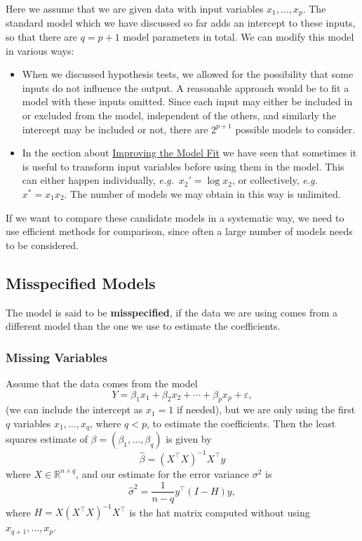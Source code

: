 \documentclass[
  a4paper,
]{article}
\theoremstyle{definition}
\theoremstyle{definition}
\theoremstyle{definition}
\theoremstyle{definition}
\theoremstyle{remark}
\begin{document}
Here we assume that we are given data with input variables \(x_1, \ldots, x_p\).
The standard model which we have discussed so far adds an intercept to these
inputs, so that there are \(q = p+1\) model parameters in total. We can modify
this model in various ways:

\begin{itemize}
\item
  When we discussed hypothesis tests, we allowed for the possibility that
  some inputs do not influence the output. A reasonable approach would
  be to fit a model with these inputs omitted. Since each input
  may either be included in or excluded from the model, independent of
  the others, and similarly the intercept may be included or not,
  there are \(2^{p+1}\) possible models to consider.
\item
  In the section about \hyperref[S11-improving]{Improving the Model Fit} we have seen that
  sometimes it is useful to transform input variables before using them
  in the model. This can either happen individually, \emph{e.g.}~\(x_2' = \log
  x_2\), or collectively, \emph{e.g.}~\(x^\ast = x_1 x_2\). The number of
  models we may obtain in this way is unlimited.
\end{itemize}

If we want to compare these candidate models in a systematic way,
we need to use efficient methods for comparison, since often a large
number of models needs to be considered.

\subsection{Misspecified Models}\label{misspecified-models}

The model is said to be \textbf{misspecified}, if the data we are using
comes from a different model than the one we use to estimate
the coefficients.

\subsubsection{Missing Variables}\label{missing-variables}

Assume that the data comes from the model
\begin{equation*}
  Y = \beta_1 x_1 + \beta_2 x_2 + \cdots + \beta_p x_p + \varepsilon,
\end{equation*}
(we can include the intercept as \(x_1 = 1\) if needed),
but we are only using the first \(q\) variables \(x_1, \ldots, x_q\),
where \(q < p\), to estimate the coefficients. Then the least squares
estimate of \(\beta = (\beta_1, \ldots, \beta_q)\) is given by
\begin{equation*}
  \hat\beta
  = (X^\top X)^{-1} X^\top y
\end{equation*}
where \(X \in \mathbb{R}^{n\times q}\),
and our estimate for the error variance \(\sigma^2\) is
\begin{equation*}
  \hat\sigma^2
  = \frac{1}{n-q} y^\top (I - H) y,
\end{equation*}
where \(H = X (X^\top X)^{-1} X^\top\) is the hat matrix computed
without using \(x_{q+1}, \ldots, x_p\).
\end{document}
